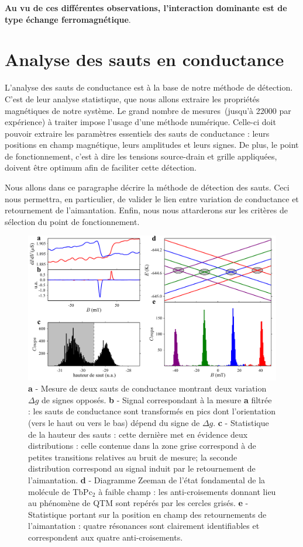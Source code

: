 \textbf{Au vu de ces différentes observations, l'interaction dominante est de type échange ferromagnétique}.

\section{Analyse des sauts en conductance}
L'analyse des sauts de conductance est à la base de notre méthode de détection. C'est de leur analyse statistique, que nous allons extraire les propriétés magnétiques de notre système. Le grand nombre de mesures~(jusqu'à 22000 par expérience) à traiter impose l'usage d'une méthode numérique. Celle-ci doit pouvoir extraire les paramètres essentiels des sauts de conductance : leurs positions en champ magnétique, leurs amplitudes et leurs signes. De plus, le point de fonctionnement, c'est à dire les tensions source-drain et grille appliquées, doivent être optimum afin de faciliter cette détection. 

Nous allons dans ce paragraphe décrire la méthode de détection des sauts. Ceci nous permettra, en particulier, de valider le lien entre variation de conductance et retournement de l'aimantation. Enfin, nous nous attarderons sur les critères de sélection du point de fonctionnement.

\begin{figure}
\includegraphics[scale=0.45]{Resultats/CondJump/CondJump.pdf} 
\caption{\textbf{a} - Mesure de deux sauts de conductance montrant deux variation $\Delta g$ de signes opposés. \textbf{b} - Signal correspondant à la mesure \textbf{a} filtrée : les sauts de conductance sont transformés en pics dont l'orientation (vers le haut ou vers le bas) dépend du signe de $\Delta g$. \textbf{c} - Statistique de la hauteur des sauts : cette dernière met en évidence deux distributions : celle contenue dans la zone grise correspond à de petites transitions relatives au bruit de mesure; la seconde distribution correspond au signal induit par le retournement de l'aimantation. \textbf{d} - Diagramme Zeeman de l'état fondamental de la molécule de TbPc$_2$ à faible champ : les anti-croisements donnant lieu au phénomène de QTM sont repérés par les cercles grisés. \textbf{e} - Statistique portant sur la position en champ des retournements de l'aimantation : quatre résonances sont clairement identifiables et correspondent aux quatre anti-croisements.}
\label{analyse_saut}
\end{figure}


